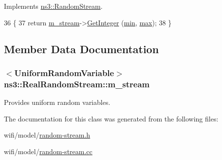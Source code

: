 Implements \hyperlink{classns3_1_1RandomStream_a29375dd4bbb99a20fb297ca355d5811a}{ns3\+::\+Random\+Stream}.


\begin{DoxyCode}
36 \{
37   \textcolor{keywordflow}{return} \hyperlink{classns3_1_1RealRandomStream_ae2f76b185f06373e4bdfa41029083088}{m\_stream}->\hyperlink{classns3_1_1RandomVariableStream_a66cd94e6305ce7f000f1a9ff0fcb9aef}{GetInteger} (\hyperlink{80211b_8c_ac6afabdc09a49a433ee19d8a9486056d}{min}, \hyperlink{80211b_8c_affe776513b24d84b39af8ab0930fef7f}{max});
38 \}
\end{DoxyCode}


\subsection{Member Data Documentation}
\subsubsection[{\texorpdfstring{m\+\_\+stream}{m_stream}}]{$<${\bf Uniform\+Random\+Variable}$>$ ns3\+::\+Real\+Random\+Stream\+::m\+\_\+stream\hspace{0.3cm}{\ttfamily [private]}}\hypertarget{classns3_1_1RealRandomStream_ae2f76b185f06373e4bdfa41029083088}{}\label{classns3_1_1RealRandomStream_ae2f76b185f06373e4bdfa41029083088}


Provides uniform random variables. 



The documentation for this class was generated from the following files\+:\begin{DoxyCompactItemize}
\item 
wifi/model/\hyperlink{random-stream_8h}{random-\/stream.\+h}\item 
wifi/model/\hyperlink{random-stream_8cc}{random-\/stream.\+cc}\end{DoxyCompactItemize}
